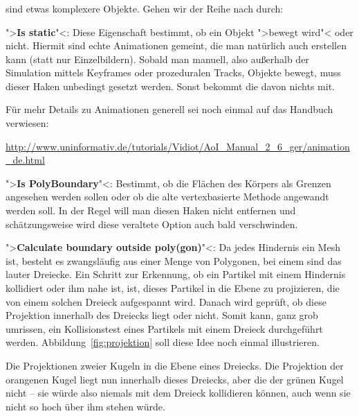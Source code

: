 \documentclass[10pt,DIV=14,a4paper]{scrartcl}
\begin{document}
\itE

\subsubsection{}
 sind etwas komplexere Objekte. Gehen wir der Reihe
nach durch:

\itA
	\item ">\textbf{Is static}"<: Diese Eigenschaft bestimmt, ob ein
	Objekt ">bewegt wird"< oder nicht. Hiermit sind echte Animationen
	gemeint, die man natürlich auch erstellen kann (statt nur
	Einzelbildern). Sobald man manuell, also außerhalb der Simulation
	mittels Keyframes oder prozeduralen Tracks, Objekte bewegt, muss
	dieser Haken unbedingt gesetzt werden. Sonst bekommt die \fluidsim
	davon nichts mit.

	Für mehr Details zu Animationen generell sei noch einmal auf das
	Handbuch verwiesen:

	\url{http://www.uninformativ.de/tutorials/Vidiot/AoI_Manual_2_6_ger/animation_de.html}

	\item ">\textbf{Is PolyBoundary}"<: Bestimmt, ob die Flächen des
	Körpers als Grenzen angesehen werden sollen oder ob die alte
	vertexbasierte Methode angewandt werden soll. In der Regel will man
	diesen Haken nicht entfernen und schätzungsweise wird diese
	veraltete Option auch bald verschwinden.

	\item ">\textbf{Calculate boundary outside poly(gon)}"<: Da jedes
	Hindernis ein Mesh ist, besteht es zwangsläufig aus einer Menge von
	Polygonen, bei einem \TriMesh sind das lauter Dreiecke. Ein Schritt
	zur Erkennung, ob ein Partikel mit einem Hindernis kollidiert oder
	ihm nahe ist, ist, dieses Partikel in die Ebene zu projizieren, die
	von einem solchen Dreieck aufgespannt wird. Danach wird geprüft, ob
	diese Projektion innerhalb des Dreiecks liegt oder nicht. Somit
	kann, ganz grob umrissen, ein Kollisionstest eines Partikels mit
	einem Dreieck durchgeführt werden. Abbildung~\ref{fig:projektion}
	soll diese Idee noch einmal illustrieren.

	{Die Projektionen zweier Kugeln in die Ebene eines Dreiecks. Die
	Projektion der orangenen Kugel liegt nun innerhalb dieses Dreiecks,
	aber die der grünen Kugel nicht -- sie würde also niemals mit dem
	Dreieck kollidieren können, auch wenn sie nicht so hoch über ihm
	stehen würde.}
\end{document}
